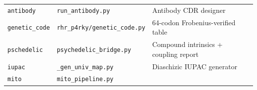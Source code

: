 \documentclass[12pt,a4paper]{article}
\begin{document}
\begin{longtable}[]{@{}lll@{}}
\begin{minipage}[t]{0.24\columnwidth}\raggedright
\texttt{antibody}\strut
\end{minipage} & \begin{minipage}[t]{0.24\columnwidth}\raggedright
\texttt{run\_antibody.py}\strut
\end{minipage} & \begin{minipage}[t]{0.43\columnwidth}\raggedright
Antibody CDR designer\strut
\end{minipage}\tabularnewline
\begin{minipage}[t]{0.24\columnwidth}\raggedright
\texttt{genetic\_code}\strut
\end{minipage} & \begin{minipage}[t]{0.24\columnwidth}\raggedright
\texttt{rhr\_p4rky/genetic\_code.py}\strut
\end{minipage} & \begin{minipage}[t]{0.43\columnwidth}\raggedright
64-codon Frobenius-verified table\strut
\end{minipage}\tabularnewline
\begin{minipage}[t]{0.24\columnwidth}\raggedright
\texttt{pschedelic}\strut
\end{minipage} & \begin{minipage}[t]{0.24\columnwidth}\raggedright
\texttt{psychedelic\_bridge.py}\strut
\end{minipage} & \begin{minipage}[t]{0.43\columnwidth}\raggedright
Compound intrinsics + coupling report\strut
\end{minipage}\tabularnewline
\begin{minipage}[t]{0.24\columnwidth}\raggedright
\texttt{iupac}\strut
\end{minipage} & \begin{minipage}[t]{0.24\columnwidth}\raggedright
\texttt{\_gen\_univ\_map.py}\strut
\end{minipage} & \begin{minipage}[t]{0.43\columnwidth}\raggedright
Diaschizic IUPAC generator\strut
\end{minipage}\tabularnewline
\begin{minipage}[t]{0.24\columnwidth}\raggedright
\texttt{mito}\strut
\end{minipage} & \begin{minipage}[t]{0.24\columnwidth}\raggedright
\texttt{mito\_pipeline.py}\strut
\end{minipage} & \begin{minipage}[t]{0.43\columnwidth}\raggedright

\end{minipage}
\end{longtable}
\end{document}
